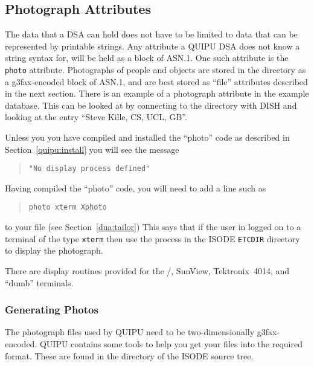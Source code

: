 \subsection {Photograph Attributes}
\label{dua:photo}

The data that a DSA can hold does not have to be limited to data that can be
represented by printable strings.
Any attribute a QUIPU DSA does not know a string syntax for, will be held as
a block of ASN.1.
One such attribute is the \verb+photo+ attribute.
Photographs of people and objects are stored in the directory as a
g3fax-encoded block of ASN.1, and are best stored as ``file'' attributes
described in the next section.
There is an example of a photograph attribute in the example database.
This can be looked at by connecting to the directory with DISH
and looking at the entry ``Steve Kille, CS, UCL, GB''.


Unless you you have compiled and installed the ``photo'' code as 
described in Section~\ref{quipu:install} you will see the message
\begin{quote}\begin{verbatim}
"No display process defined"
\end{verbatim}\end{quote}

Having compiled the ``photo'' code, you will need to add a line such
as
\begin{quote}\small\begin{verbatim}
photo xterm Xphoto
\end{verbatim}\end{quote}
to your  file (see Section~\ref{dua:tailor})
This says that if the user in logged on to a terminal
of the type \verb"xterm" then use the process 
in the ISODE \verb"ETCDIR" directory to display the photograph.

There are display routines provided for the \xwindows/,
SunView, 
Tektronix~4014, and ``dumb'' terminals.

\subsubsection{Generating Photos}

The photograph files used by QUIPU need to be two-dimensionally
g3fax-encoded.   QUIPU contains some tools to help you get your files into
the required format.  These are found in the 
directory of the ISODE source tree.

